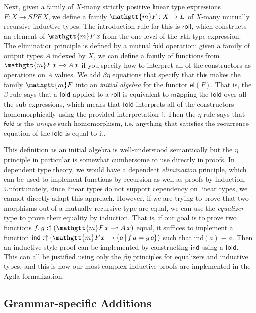 \documentclass[acmsmall,nonacm]{acmart}
\renewcommand{\mu}{\mathgtt{m}}
\newcommand{\SPF}{SPF}
\newcommand{\roll}{\mathsf{roll}}
\newcommand{\fold}{\mathsf{fold}}
\newcommand{\lto}{\multimap}
\newcommand{\el}{\mathsf{el}}
\newcommand{\applto}[2]{#1 \, #2}
\newcommand{\equalizer}[3]{\{#1\,|\,\applto {#2}{#1} = \applto{#3}{#1} \}}
\newif\ifdraft
\newcommand{\pedro}[1]{\ifdraft{\color{red}[{\bf Pedro says}: #1]}\fi}
\begin{document}
Next, given a family of $X$-many strictly positive linear type
expressions $F : X \to \SPF\,X$, we define a family $\mu F : X \to L$
of $X$-many mutually recursive inductive types. The introduction rule
for this is $\roll$, which constructs an element of $\mu F\,x$ from
the one-level of the $x$th type expression. The elimination principle
is defined by a mutual $\fold$ operation: given a family of output
types $A$ indexed by $X$, we can define a family of functions from
$\mu F\,x \multimap A\,x$ if you specify how to interpret all of the
constructors as operations on $A$ values. We add $\beta\eta$ equations
that specify that this makes the family $\mu F$ into an \emph{initial
algebra} for the functor $\el(F)$. That is, the $\beta$ rule says that
a $\mathsf{fold}$ applied to a $\mathsf{roll}$ is equivalent to
$\mathsf{map}$ping the $\mathsf{fold}$ over all the sub-expressions,
which means that $\mathsf{fold}$ interprets all of the constructors
homomorphically using the provided interpretation $\mathsf{f}$. Then
the $\eta$ rule says that $\mathsf{fold}$ is the \emph{unique} such
homomorphism, i.e. anything that satisfies the recurrence equation of
the $\mathsf{fold}$ is equal to it.

This definition as an initial algebra is well-understood semantically
but the $\eta$ principle in particular is somewhat cumbersome to use
directly in proofs. In dependent type theory, we would have a
dependent \emph{elimination} principle, which can be used to
implement functions by recursion as well as proofs by
induction. Unfortunately, since linear types do not support dependency on
linear types, we cannot directly adapt this approach. However, if we
are trying to prove that two morphisms out of a mutually recursive
type are equal, we can use the \emph{equalizer} type to prove their
equality by induction. That is, if our goal is to prove two functions
$f,g : \uparrow(\mu F\,x \lto A\,x)$ equal, it suffices to
implement a function $\mathsf{ind} : \uparrow(\mu F\,x \lto \equalizer
{a} f g)$ such that $\textrm{ind}(a) \equiv a$. Then an
inductive-style proof can be implemented by constructing
$\mathsf{ind}$ using a $\fold$. This can all be justified using only
the $\beta\eta$ principles for equalizers and inductive types, and
this is how our most complex inductive proofs are implemented in the Agda
formalization.
\pedro{I don't like the inductive proof explanation above, but I
  don't know how I would phrase it}

\subsection{Grammar-specific Additions}
\end{document}
